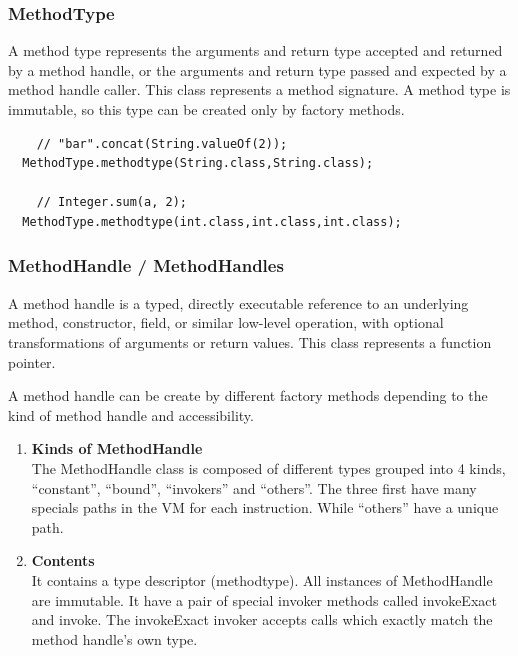 \documentclass{sigplanconf}
\def \DALVIK{\mbox{Dalvik}\xspace}
\def \VM{VM\xspace}
\begin{document}
      \subsubsection{MethodType}
        A method type represents the arguments and return type accepted and returned by a method handle,
        or the arguments and return type passed and expected by a method handle caller.
        This class represents a method signature.
        A method type is immutable, so this type can be created only by factory methods.
        

        {\tiny
          \begin{verbatim}
    // "bar".concat(String.valueOf(2));
  MethodType.methodtype(String.class,String.class);

    // Integer.sum(a, 2);
  MethodType.methodtype(int.class,int.class,int.class);
          \end{verbatim}
        }

      \subsubsection{MethodHandle / MethodHandles}
        A method handle is a typed, directly executable reference to
        an underlying method, constructor, field, or similar low-level operation,
        with optional transformations of arguments or return values.
        This class represents a function pointer.
        
        A method handle can be create by different factory methods depending to the kind of method handle and accessibility.
        

        \begin{enumerate}
          \item \textbf{Kinds of MethodHandle}\\
            The MethodHandle class is composed of different types grouped into 4 kinds,
            ``constant'', ``bound'', ``invokers'' and ``others''.
            The three first have many specials paths in the \VM for each instruction.
            While ``others'' have a unique path.
          \item \textbf{Contents}\\
            It contains a type descriptor (methodtype).
            All instances of MethodHandle are immutable.
            It have a pair of special invoker methods called invokeExact and invoke.
            The invokeExact invoker accepts calls which exactly match the method handle's own type.
        \end{enumerate}
\end{document}
